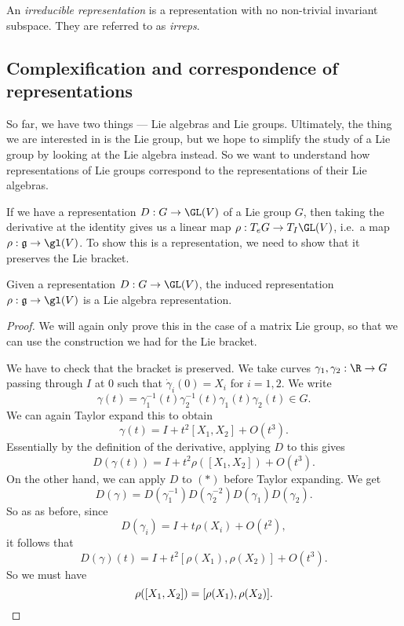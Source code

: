 \documentclass[a4paper]{article}
\begin{document}
\begin{defi}
  An \emph{irreducible representation} is a representation with no non-trivial invariant subspace. They are referred to as \emph{irreps}.
\end{defi}

\subsection{Complexification and correspondence of representations}
So far, we have two things --- Lie algebras and Lie groups. Ultimately, the thing we are interested in is the Lie group, but we hope to simplify the study of a Lie group by looking at the Lie algebra instead. So we want to understand how representations of Lie groups correspond to the representations of their Lie algebras.

If we have a representation $D: G \to \GL(V)$ of a Lie group $G$, then taking the derivative at the identity gives us a linear map $\rho: T_e G \to T_I \GL(V)$, i.e.\ a map $\rho: \mathfrak{g} \to \gl(V)$. To show this is a representation, we need to show that it preserves the Lie bracket.

\begin{lemma}
  Given a representation $D: G \to \GL(V)$, the induced representation $\rho: \mathfrak{g} \to \gl(V)$ is a Lie algebra representation.
\end{lemma}

\begin{proof}
  We will again only prove this in the case of a matrix Lie group, so that we can use the construction we had for the Lie bracket.

  We have to check that the bracket is preserved. We take curves $\gamma_1, \gamma_2: \R \to G$ passing through $I$ at $0$ such that $\dot{\gamma}_i(0) = X_i$ for $i = 1, 2$. We write
  \[
    \gamma(t) = \gamma_1^{-1}(t) \gamma_2^{-1}(t)\gamma_1(t)\gamma_2(t) \in G.
  \]
  We can again Taylor expand this to obtain
  \[
    \gamma(t) = I + t^2 [X_1, X_2] + O(t^3).
  \]
  Essentially by the definition of the derivative, applying $D$ to this gives
  \[
    D(\gamma(t)) = I + t^2 \rho([X_1, X_2]) + O(t^3).
  \]
  On the other hand, we can apply $D$ to $(*)$ before Taylor expanding. We get
  \[
    D(\gamma) = D(\gamma_1^{-1}) D(\gamma_2^{-2}) D(\gamma_1) D(\gamma_2).
  \]
  So as as before, since
  \[
    D(\gamma_i) = I + t \rho(X_i) + O(t^2),
  \]
  it follows that
  \[
    D(\gamma)(t) = I + t^2 [\rho(X_1), \rho(X_2)] + O(t^3).
  \]
  So we must have
  \[
    \rho([X_1, X_2]) = [\rho(X_1), \rho(X_2)]. \qedhere
  \]
\end{proof}
\end{document}
